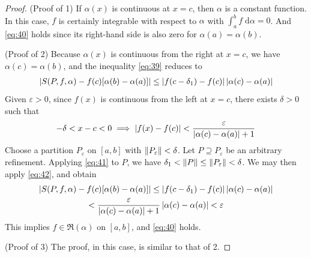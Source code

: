 \documentclass[thmcnt=section, 12pt]{my-elegantbook}
\begin{document}
\begin{proof}
    \par (Proof of 1) If $\alpha(x)$ is continuous at $x=c$, then $\alpha$ is a constant function. In this case, $f$ is certainly integrable with respect to $\alpha$ with $\int_{a}^{b} f \; \mathrm{d}\alpha = 0$. And \eqref{eq:40} holds since its right-hand side is also zero for $\alpha(a) = \alpha(b)$.

    \par (Proof of 2) Because $\alpha(x)$ is continuous from the right at $x=c$, we have $\alpha(c) = \alpha(b)$, and the inequality \eqref{eq:39} reduces to 
    \begin{align}
        \left\lvert 
            S(P,f,\alpha)
            - f(c) [\alpha(b) - \alpha(a)]
         \right\rvert
        \leq \left\lvert f(c-\delta_1) - f(c) \right\rvert \left\lvert \alpha(c) - \alpha(a) \right\rvert
        \label{eq:41}
    \end{align} 
    Given $\varepsilon > 0$, since $f(x)$ is continuous from the left at $x=c$, there exists $\delta > 0$ such that 
    \begin{align}
        -\delta < x - c < 0
        \implies \left\lvert f(x) - f(c) \right\rvert < \frac{\varepsilon}{\left\lvert \alpha(c) - \alpha(a) \right\rvert + 1}
        \label{eq:42}
    \end{align}
    Choose a partition $P_\varepsilon$ on $[a, b]$ with $\left\lVert P_\varepsilon \right\rVert < \delta$. Let $P \supseteq P_\varepsilon$ be an arbitrary refinement. Applying \eqref{eq:41} to $P$, we have $\delta_1 < \left\lVert P \right\rVert \leq \left\lVert P_\varepsilon \right\rVert<\delta$. We may then apply \eqref{eq:42}, and obtain
    \begin{multline*}
        \left\lvert 
            S(P,f,\alpha)
            - f(c) [\alpha(b) - \alpha(a)]
         \right\rvert
        \leq \left\lvert f(c-\delta_1) - f(c) \right\rvert \left\lvert \alpha(c) - \alpha(a) \right\rvert \\
        < \frac{\varepsilon}{\left\lvert \alpha(c) - \alpha(a) \right\rvert + 1} \left\lvert \alpha(c) - \alpha(a) \right\rvert
        < \varepsilon
    \end{multline*}
    This implies $f \in \mathfrak{R}(\alpha)$ on $[a, b]$, and \eqref{eq:40} holds.

    \par (Proof of 3) The proof, in this case, is similar to that of 2.


\end{proof}
\end{document}
